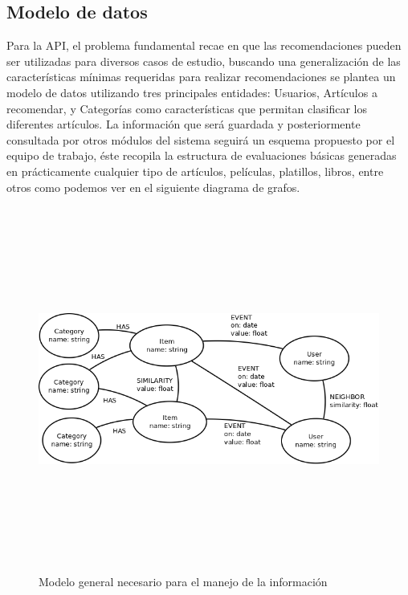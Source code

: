     \subsection{Modelo de datos}
      Para la API, el problema fundamental recae en que las recomendaciones pueden ser utilizadas para diversos casos de estudio, buscando una generalización de las características mínimas requeridas para realizar recomendaciones se plantea un modelo de datos utilizando tres principales entidades: Usuarios, Artículos a recomendar, y Categorías como características que permitan clasificar los diferentes artículos. La información que será guardada y posteriormente consultada por otros módulos del sistema seguirá un esquema propuesto por el equipo de trabajo, éste recopila la estructura de evaluaciones básicas generadas en prácticamente cualquier tipo de artículos, películas, platillos, libros, entre otros como podemos ver en el siguiente diagrama de grafos.

      \newpage
          \begin{landscape}
            \begin{figure}[h!]
            \centering
            \includegraphics[width=22.5cm,height=12cm]{./images/general_data_model.png}
            \caption{Modelo general necesario para el manejo de la información}
          \end{figure}
          \end{landscape}
        \newpage

